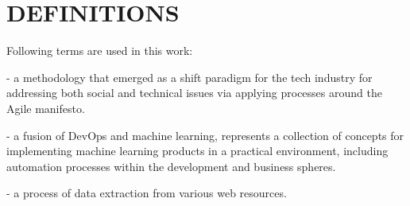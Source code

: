 





\chapter*[Definitions]{DEFINITIONS}

Following terms are used in this work:

\begin{definitions}[4cm] %
    \item [DevOps] - a methodology that emerged as a shift paradigm for the tech industry for addressing both social and technical issues via applying processes around the Agile manifesto.
    \item [MLOps] - a fusion of DevOps and machine learning, represents a collection of concepts for implementing machine learning products in a practical environment, including automation processes within the development and business spheres.
    \item [Web scraping] - a process of data extraction from various web resources.
\end{definitions}







